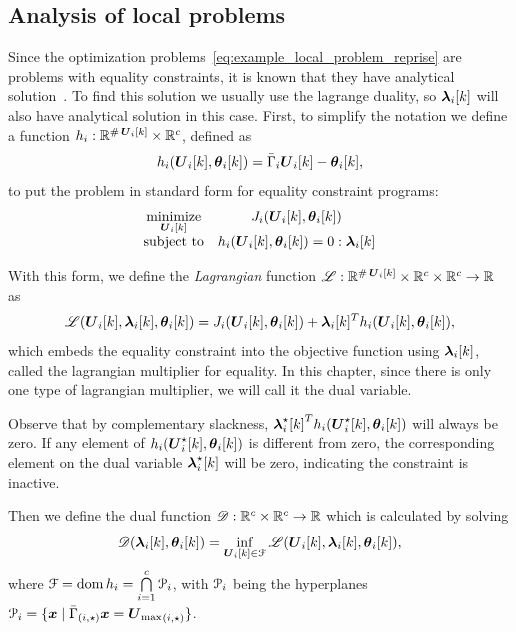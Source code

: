 \documentclass[../main.tex]{subfiles}
\begin{document}
\subsection{Analysis of local problems}\label{sec:analysis-local-problems}
Since the optimization problems~\eqref{eq:example_local_problem_reprise} are \qp{} problems with equality constraints, it is known that they have analytical solution~\cite{BoydVandenberghe2004}.
To find this solution we usually use the lagrange duality, so $\lambdaik$ will also have analytical solution in this case.
First, to simplify the notation we define a function $\equalityfunctionname:\R^{\card\vec{U}_{i}[k]}\times \R^{c}$, defined as
\begin{equation}
  \label{eq:lagrangian_equality}
  \equalityfunction=\bar{\Gamma}_{i}\vec{U}_i[k]-\thetaik,
\end{equation}
to put the problem in standard form for equality constraint \qp{} programs:
\begin{equation}
  \begin{matrix}
  \label{eq:local_problem_equality_standard_notation}
    \minimize\limits_{\vec{U}_{i}[k]}&\obji(\vec{U}_{i}[k],\thetaik)\\
    \mathrm{subject~ to} & \equalityfunction= 0:\lambdaik
  \end{matrix}
\end{equation}

With this form, we define the \emph{Lagrangian} function $\lagrangianname : \R^{\card\vec{U}_{i}[k]}\times \R^{c} \times \R^{c} \to \R$ as
\begin{equation}
  \label{eq:lagrangian_equality}
  \lagrangian=\obji(\vec{U}_{i}[k],\thetaik)+\lambdaik^T\equalityfunction,
\end{equation}
which embeds the equality constraint into the objective function using $\lambdaik$, called the lagrangian multiplier for equality.
In this chapter, since there is only one type of lagrangian multiplier, we will call it the dual variable.
\begin{remark}
  Observe that by complementary slackness, ${\lambdaikstar}^T\equalityfunctionname(\vec{U}_{i}^{\star}[k],\thetaik)$ will always be zero.
 If any element of $\equalityfunctionname(\vec{U}_{i}^{\star}[k],\thetaik)$ is different from zero, the corresponding element on the dual variable $\lambdaikstar$ will be zero, indicating the constraint is inactive.
\end{remark}

Then we define the dual function $\dualfunctionname:\R^{c} \times \R^{c} \to \R$ which is calculated by solving
\begin{equation}
  \label{eq:dual_function_equality}
  \dualfunction=\inf_{\vec{U}_{i}[k]\in\set{F}} \lagrangian,
\end{equation}
where $\set{F}=\dom \equalityfunctionname=\bigcap\limits_{i=1}^{c}\set{P}_{i}$, with $\set{P}_{i}$ being the hyperplanes
${\set{P}_i=\setbuild{\vec{x}}{\elem[i,\star]{{\bar{\Gamma}}}\vec{x}=\elem[i,\star]{\vec{U}_{\max}}}}$.
\end{document}
